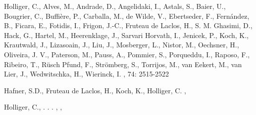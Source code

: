 \documentclass[]{article}
\begin{document}
\begin{thebibliography}{1}

Holliger, C., Alves, M., Andrade, D., Angelidaki, I., Astals, S., Baier, U., Bougrier, C., Buffi{\`e}re, P., Carballa, M., de Wilde, V., Ebertseder, F., Fern{\'a}ndez, B., Ficara, E., Fotidis, I., Frigon, J.-C., Fruteau de Laclos, H., S. M. Ghasimi, D., Hack, G., Hartel, M., Heerenklage, J., Sarvari Horvath, I., Jenicek, P., Koch, K., Krautwald, J., Lizasoain, J., Liu, J., Mosberger, L., Nistor, M., Oechsner, H., Oliveira, J. V., Paterson, M., Pauss, A., Pommier, S., Porqueddu, I., Raposo, F., Ribeiro, T., R{\"u}sch Pfund, F., Str{\"o}mberg, S., Torrijos, M., van Eekert, M., van Lier, J., Wedwitschka, H., Wierinck, I.
,
 74: 2515-2522

  Hafner, S.D., Fruteau de Laclos, H., Koch, K., Holliger, C.
,

Holliger, C., . . .
    ,
    ,


\end{thebibliography}
\end{document}
